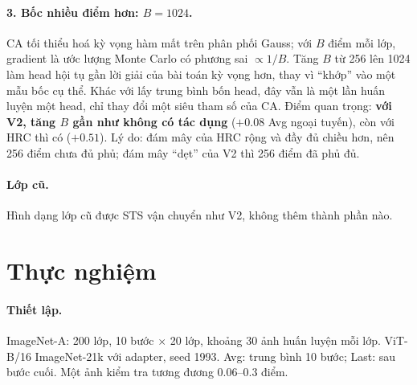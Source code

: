 \documentclass[11pt]{article}
\begin{document}
\paragraph{3. Bốc nhiều điểm hơn: $B=1024$.} CA tối thiểu hoá kỳ vọng hàm mất trên phân phối Gauss; với $B$ điểm mỗi
lớp, gradient là ước lượng Monte Carlo có phương sai $\propto1/B$. Tăng $B$ từ 256 lên 1024 làm head hội tụ gần lời giải
của bài toán kỳ vọng hơn, thay vì ``khớp'' vào một mẫu bốc cụ thể. Khác với lấy trung bình bốn head, đây vẫn là một lần
huấn luyện một head, chỉ thay đổi một siêu tham số của CA. Điểm quan trọng: \textbf{với V2, tăng $B$ gần như không có
tác dụng} ($+0.08$ Avg ngoại tuyến), còn với HRC thì có ($+0.51$). Lý do: đám mây của HRC rộng và đầy đủ chiều hơn,
nên 256 điểm chưa đủ phủ; đám mây ``dẹt'' của V2 thì 256 điểm đã phủ đủ.

\paragraph{Lớp cũ.} Hình dạng lớp cũ được STS vận chuyển như V2, không thêm thành phần nào.

\section{Thực nghiệm}
\paragraph{Thiết lập.} ImageNet-A: 200 lớp, 10 bước $\times$ 20 lớp, khoảng 30 ảnh huấn luyện mỗi lớp. ViT-B/16
ImageNet-21k với adapter, seed 1993. Avg: trung bình 10 bước; Last: sau bước cuối. Một ảnh kiểm tra tương đương
$0.06$--$0.3$ điểm.
\end{document}
